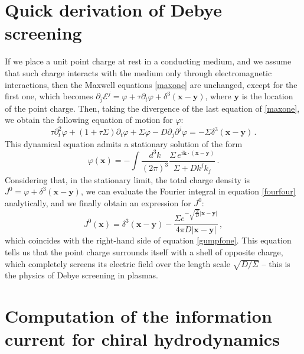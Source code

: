 \documentclass[a4paper, amsfonts, amssymb, amsmath, reprint, showkeys, nofootinbib, twoside,notitlepage,onecolumn,preprintnumbers]{revtex4-2}
\theoremstyle{definition}
\theoremstyle{theorem}
\theoremstyle{corollary}
\begin{document}
\section{Quick derivation of Debye screening}\label{debby}

If we place a unit point charge at rest in a conducting medium, and we assume that such charge interacts with the medium only through electromagnetic interactions, then the Maxwell equations \eqref{maxone} are unchanged, except for the first one, which becomes $\partial_j \mathcal{E}^j=\varphi+\tau \partial_t \varphi+\delta^3(\textbf{x}-\textbf{y})$, where $\textbf{y}$ is the location of the point charge. Then, taking the divergence of the last equation of \eqref{maxone}, we obtain the following equation of motion for $\varphi$:
\begin{equation}
    \tau \partial^2_t \varphi +(1+\tau \Sigma )\partial_t \varphi +\Sigma \varphi -D \partial_j \partial^j \varphi =-\Sigma \delta^3(\textbf{x}-\textbf{y}) \, .
\end{equation}
This dynamical equation admits a stationary solution of the form
\begin{equation}\label{fourfour}
    \varphi(\textbf{x}) = -\int \dfrac{d^3 k}{(2\pi)^3} \dfrac{\Sigma \, e^{i\textbf{k}\cdot (\textbf{x}-\textbf{y})}}{\Sigma + D k^j k_j} \, .
\end{equation}
Considering that, in the stationary limit, the total charge density is $J^0=\varphi +\delta^3(\textbf{x}-\textbf{y})$, we can evaluate the Fourier integral in equation \eqref{fourfour} analytically, and we finally obtain an expression for $J^0$:
\begin{equation}
    J^0(\textbf{x})=\delta^3(\textbf{x}-\textbf{y}) - \dfrac{\Sigma e^{-\sqrt{\frac{\Sigma}{D}}|\textbf{x}-\textbf{y}|}}{4\pi D |\textbf{x}-\textbf{y}|} \, ,
\end{equation}
which coincides with the right-hand side of equation \eqref{gumpfone}. This equation tells us that the point charge surrounds itself with a shell of opposite charge, which completely screens its electric field over the length scale $\sqrt{D/\Sigma}$ -- this is the physics of Debye screening in plasmas.

\section{Computation of the information current for chiral hydrodynamics}\label{twonicks}
\end{document}
